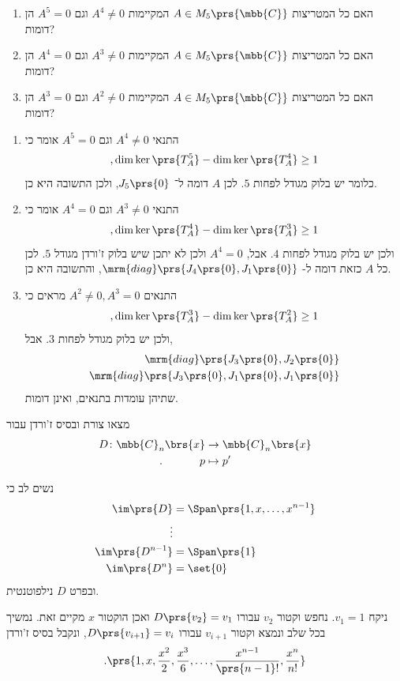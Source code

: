 \documentclass[a4paper,10pt,twoside,openany]{book}
\begin{document}
\begin{exercisechap}
\begin{enumerate}
\item האם כל המטריצות
$A \in M_5\prs{\mbb{C}}$
המקיימות
$A^4 \neq 0$
וגם
$A^5 = 0$
הן דומות?

\item האם כל המטריצות
$A \in M_5\prs{\mbb{C}}$
המקיימות
$A^3 \neq 0$
וגם
$A^4 = 0$
הן דומות?

\item האם כל המטריצות
$A \in M_5\prs{\mbb{C}}$
המקיימות
$A^2 \neq 0$
וגם
$A^3 = 0$
הן דומות?
\end{enumerate}
\end{exercisechap}

\begin{solution}
\begin{enumerate}
\item התנאי
$A^4 \neq 0$
וגם
$A^5 = 0$
אומר כי
\[\text{,}\dim \ker\prs{T_A^5} - \dim \ker\prs{T_A^4} \geq 1\]
כלומר יש בלוק מגודל לפחות
$5$.
לכן
$A$
דומה ל־%
$J_5\prs{0}$,
ולכן התשובה היא כן.
\item התנאי
$A^3 \neq 0$
וגם
$A^4 = 0$
אומר כי
\[\text{,} \dim \ker\prs{T_A^4} - \dim \ker\prs{T_A^3} \geq 1\]
ולכן יש בלוק מגודל לפחות
$4$.
אבל,
$A^4 = 0$
ולכן לא יתכן שיש בלוק ז'ורדן מגודל
$5$.
לכן כל
$A$
כזאת דומה ל-%
$\mrm{diag}\prs{J_4\prs{0}, J_1\prs{0}}$,
והתשובה היא כן.
\item התנאים
$A^2 \neq 0, A^3 = 0$
מראים כי
\[\text{,} \dim \ker\prs{T_A^3} - \dim \ker\prs{T_A^2} \geq 1\]
ולכן יש בלוק מגודל לפחות
$3$.
אבל,
\begin{align*}
\mrm{diag}\prs{J_3\prs{0}, J_2\prs{0}} \\
\mrm{diag}\prs{J_3\prs{0}, J_1\prs{0}, J_1\prs{0}}
\end{align*}
שתיהן עומדות בתנאים, ואינן דומות.
\end{enumerate}
\end{solution}

\begin{exercisechap}
מצאו צורת ובסיס ז'ורדן עבור
\begin{align*}
D \colon \mbb{C}_n\brs{x} &\to \mbb{C}_n\brs{x} \\
\text{.} \hphantom{lalalala} p &\mapsto p'
\end{align*}
\end{exercisechap}

\begin{solution}
נשים לב כי
\begin{align*}
\im\prs{D} &= \Span\prs{1, x, \ldots, x^{n-1}} \\
\vdots \\
\im\prs{D^{n-1}} &= \Span\prs{1} \\
\im\prs{D^n} &= \set{0}
\end{align*}
ובפרט
$D$
נילפוטנטית.

ניקח
$v_1 = 1$.
נחפש וקטור
$v_2$
עבורו
$D\prs{v_2} = v_1$
ואכן הוקטור
$x$
מקיים זאת.
נמשיך בכל שלב ונמצא וקטור
$v_{i+1}$
עבורו
$D\prs{v_{i+1}} = v_{i}$,
ונקבל בסיס ז'ורדן
\[\text{.} \prs{1, x, \frac{x^2}{2}, \frac{x^3}{6}, \ldots, \frac{x^{n-1}}{\prs{n-1}!}, \frac{x^n}{n!}}\]
\end{solution}
\end{document}
